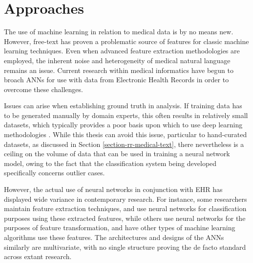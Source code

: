  \section{Approaches}
\label{section:ann-approaches}







The use of machine learning in relation to medical data is by no means new. However, free-text has proven a problematic source of features for classic machine learning techniques. Even when advanced feature extraction methodologies are employed, the inherent noise and heterogeneity of medical natural language remains an issue. Current research within medical informatics have begun to broach ANNs for use with data from Electronic Health Records in order to overcome these challenges. 

Issues can arise when establishing ground truth in analysis. If training data has to be generated manually by domain experts, this often results in relatively small datasets, which typically provides a poor basis upon which to use deep learning methodologies \cite{gehrmann2018comparing,geraci2017applying,yao2016convolutional}.  While this thesis can avoid this issue, particular to hand-curated datasets, as discussed in Section \ref{section-rr-medical-text}, there nevertheless is a ceiling on the volume of data that can be used in training a neural network model, owing to the fact that the classification system being developed specifically concerns outlier cases. 

However, the actual use of neural networks in conjunction with EHR has displayed wide variance in contemporary research. For instance, some researchers maintain feature extraction techniques, and use neural networks for classification purposes using these extracted features, while others use neural networks for the purposes of feature transformation, and have other types of machine learning algorithms use these features. The architectures and designs of the ANNs similarly are multivariate, with no single structure proving the de facto standard across extant research.

